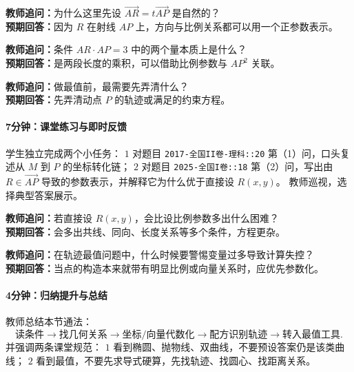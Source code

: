 \documentclass[UTF8,a4paper,11pt]{ctexart}
\begin{document}
\noindent\textbf{教师追问：}为什么这里先设 $\overrightarrow{AR}=t\overrightarrow{AP}$ 是自然的？\\

\textbf{预期回答：}因为 $R$ 在射线 $AP$ 上，方向与比例关系都可以用一个正参数表示。\par

\noindent\textbf{教师追问：}条件 $AR\cdot AP=3$ 中的两个量本质上是什么？\\

\textbf{预期回答：}是两段长度的乘积，可以借助比例参数与 $AP^2$ 关联。\par

\noindent\textbf{教师追问：}做最值前，最需要先弄清什么？\\

\textbf{预期回答：}先弄清动点 $P$ 的轨迹或满足的约束方程。\par

\paragraph{7分钟：课堂练习与即时反馈}

学生独立完成两个小任务：
\(1\) 对题目 \texttt{2017-全国II卷-理科::20} 第（1）问，口头复述从 $M$ 到 $P$ 的坐标转化链；
\(2\) 对题目 \texttt{2025-全国I卷::18} 第（2）问，写出由 $R\in \overrightarrow{AP}$ 导致的参数表示，并解释它为什么优于直接设 $R(x,y)$。
教师巡视，选择典型答案展示。

\noindent\textbf{教师追问：}若直接设 $R(x,y)$，会比设比例参数多出什么困难？\\

\textbf{预期回答：}会多出共线、同向、长度关系等多个条件，方程更杂。\par

\noindent\textbf{教师追问：}在轨迹最值问题中，什么时候要警惕变量过多导致计算失控？\\

\textbf{预期回答：}当点的构造本来就带有明显比例或向量关系时，应优先参数化。\par

\paragraph{4分钟：归纳提升与总结}

教师总结本节通法：
\[
\text{读条件}\to\text{找几何关系}\to\text{坐标/向量代数化}\to\text{配方识别轨迹}\to\text{转入最值工具}.
\]
并强调两条课堂规范：
\(1\) 看到椭圆、抛物线、双曲线，不要预设答案仍是该类曲线；
\(2\) 看到最值，不要先求导式硬算，先找轨迹、找圆心、找距离关系。
\end{document}
